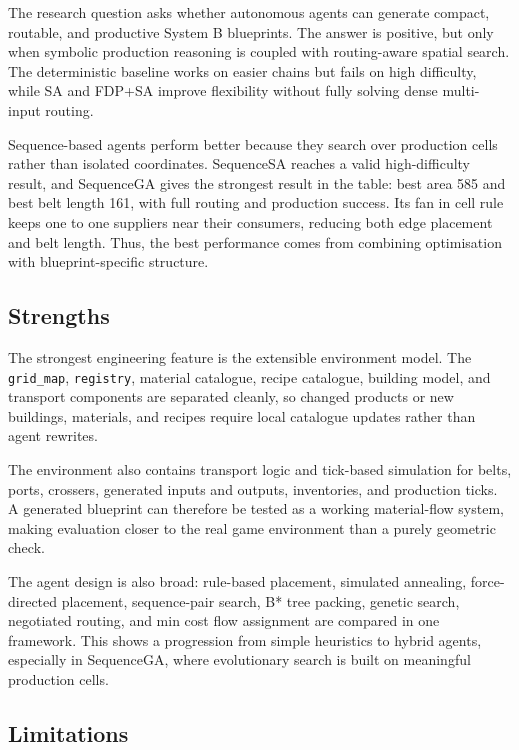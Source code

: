 \documentclass[11pt,a4paper]{article}
\begin{document}
The research question asks whether autonomous agents can generate compact, routable, and productive System B blueprints. The answer is positive, but only when symbolic production reasoning is coupled with routing-aware spatial search. The deterministic baseline works on easier chains but fails on high difficulty, while SA and FDP+SA improve flexibility without fully solving dense multi-input routing.

Sequence-based agents perform better because they search over production cells rather than isolated coordinates. SequenceSA reaches a valid high-difficulty result, and SequenceGA gives the strongest result in the table: best area 585 and best belt length 161, with full routing and production success. Its fan in cell rule keeps one to one suppliers near their consumers, reducing both edge placement and belt length. Thus, the best performance comes from combining optimisation with blueprint-specific structure.

\subsection{Strengths}

The strongest engineering feature is the extensible environment model. The \texttt{grid\_map}, \texttt{registry}, material catalogue, recipe catalogue, building model, and transport components are separated cleanly, so changed products or new buildings, materials, and recipes require local catalogue updates rather than agent rewrites.

The environment also contains transport logic and tick-based simulation for belts, ports, crossers, generated inputs and outputs, inventories, and production ticks. A generated blueprint can therefore be tested as a working material-flow system, making evaluation closer to the real game environment than a purely geometric check.

The agent design is also broad: rule-based placement, simulated annealing, force-directed placement, sequence-pair search, B* tree packing, genetic search, negotiated routing, and min cost flow assignment are compared in one framework. This shows a progression from simple heuristics to hybrid agents, especially in SequenceGA, where evolutionary search is built on meaningful production cells.

\subsection{Limitations}
\end{document}
